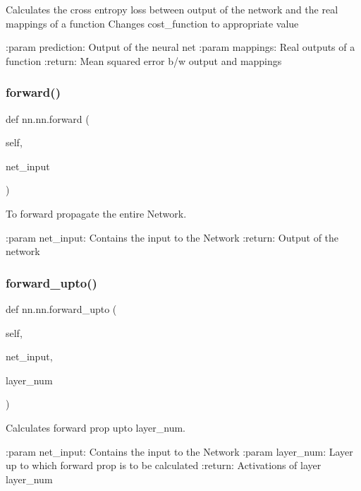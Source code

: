 \begin{DoxyVerb}Calculates the cross entropy loss between output of the network and the real mappings of a function
Changes cost_function to appropriate value

:param prediction: Output of the neural net
:param mappings: Real outputs of a function
:return: Mean squared error b/w output and mappings
\end{DoxyVerb}
 \mbox{\label{classnn_1_1nn_ae07002745b03901814d92ac66fe87781}} 
\subsubsection{\texorpdfstring{forward()}{forward()}}
{\footnotesize\ttfamily def nn.\+nn.\+forward (\begin{DoxyParamCaption}\item[{}]{self,  }\item[{}]{net\+\_\+input }\end{DoxyParamCaption})}

\begin{DoxyVerb}To forward propagate the entire Network.

:param net_input: Contains the input to the Network
:return: Output of the network
\end{DoxyVerb}
 \mbox{\label{classnn_1_1nn_ac3d2b61ed992dc615eacda8e75a61a2b}} 
\subsubsection{\texorpdfstring{forward\+\_\+upto()}{forward\_upto()}}
{\footnotesize\ttfamily def nn.\+nn.\+forward\+\_\+upto (\begin{DoxyParamCaption}\item[{}]{self,  }\item[{}]{net\+\_\+input,  }\item[{}]{layer\+\_\+num }\end{DoxyParamCaption})}

\begin{DoxyVerb}Calculates forward prop upto layer_num.

:param net_input: Contains the input to the Network
:param layer_num: Layer up to which forward prop is to be calculated
:return: Activations of layer layer_num
\end{DoxyVerb}
 \mbox{\label{classnn_1_1nn_a9821fed1369b4d709fe297fe9e07d97b}} 
